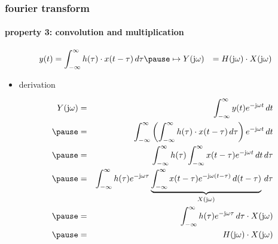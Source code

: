 	\begin{frame}\frametitle{fourier transform}\framesubtitle{property 3: convolution and multiplication}
		\vspace{-5mm}
        \begin{eqnarray}
			y(t) &= \int_{-\infty}^{\infty} {h(\tau) \cdot x(t-\tau)\, d\tau}\pause\mapsto 
			Y(\jom) &= H(\jom)\cdot X(\jom) \nonumber
		\end{eqnarray}
		\pause
		\begin{itemize}
			\item[]	derivation
					\begin{footnotesize}
				\begin{eqnarray}
					Y(\jom)	&=& \int_{-\infty}^{\infty} {y(t) \e^{-\jom t}\, dt}\nonumber\\
							\pause
								&=& \int_{-\infty}^{\infty} {\left(\int_{-\infty}^{\infty} {h(\tau) \cdot x(t-\tau)\, d\tau}\right) \e^{-\jom t}\, dt}\nonumber\\
							\pause
								&=& \int_{-\infty}^{\infty} {h(\tau) \int_{-\infty}^{\infty} {x(t-\tau)} \e^{-\jom t}\, dt\, d\tau}\nonumber\\
							\pause
								&=& \int_{-\infty}^{\infty} {h(\tau)  \e^{-\jom \tau} \underbrace{\int_{-\infty}^{\infty} {x(t-\tau)} \e^{-\jom (t-\tau)}\, d(t-\tau)}_{X(\jom)}\, d\tau}\nonumber\\
							\pause
								&=& \int_{-\infty}^{\infty} {h(\tau) \e^{-\jom \tau}\, d\tau} \cdot X(\jom)\nonumber\\
							\pause
								&=& H(\jom) \cdot X(\jom)\label{eq:mult_conv} 
				\end{eqnarray}
					\end{footnotesize}
		\end{itemize}
	\end{frame}	

